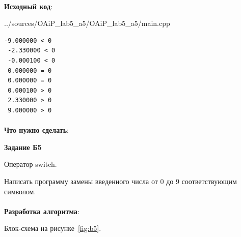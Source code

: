 \documentclass[12pt, a4paper, simple]{eskdtext}
\begin{document}
\newpage

\paragraph{} \textbf{Исходный код}: 


{../sources/OAiP_lab5_a5/OAiP_lab5_a5/main.cpp}

\begin{lstlisting}[name=Вывод в консоль]
 -9.000000 < 0
 -2.330000 < 0
 -0.000100 < 0
 0.000000 = 0
 0.000000 = 0
 0.000100 > 0
 2.330000 > 0
 9.000000 > 0
\end{lstlisting}

\newpage

\paragraph{} \textbf{Что нужно сделать}:

\begin{center}
    \textbf{Задание Б5}
\end{center}

Оператор switch.

Написать программу замены введенного числа от 0 до 9 соответствующим символом.

\paragraph{} \textbf{Разработка алгоритма}:

Блок-схема на рисунке~\ref{fig:b5}.
\end{document}
